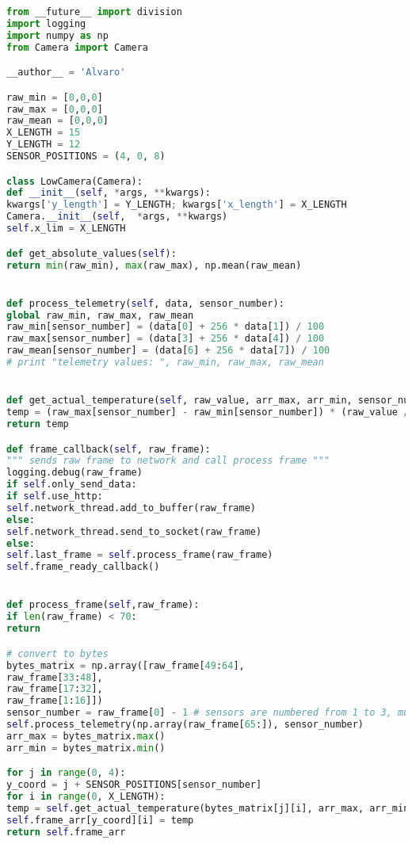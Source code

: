 \documentclass[hidelinks,11pt,a4paper,oneside,article]{memoir}
\begin{document}
\begin{lstlisting}[label={listing:lowcamera},caption={Processing of the Low camera},language=Python, style=styleprogramming]
from __future__ import division
import logging
import numpy as np
from Camera import Camera

__author__ = 'Alvaro'

raw_min = [0,0,0]
raw_max = [0,0,0]
raw_mean = [0,0,0]
X_LENGTH = 15
Y_LENGTH = 12
SENSOR_POSITIONS = (4, 0, 8)

class LowCamera(Camera):
def __init__(self, *args, **kwargs):
kwargs['y_length'] = Y_LENGTH; kwargs['x_length'] = X_LENGTH
Camera.__init__(self,  *args, **kwargs)
self.x_lim = X_LENGTH

def get_absolute_values(self):
return min(raw_min), max(raw_max), np.mean(raw_mean)


def process_telemetry(self, data, sensor_number):
global raw_min, raw_max, raw_mean
raw_min[sensor_number] = (data[0] + 256 * data[1]) / 100
raw_max[sensor_number] = (data[3] + 256 * data[4]) / 100
raw_mean[sensor_number] = (data[6] + 256 * data[7]) / 100
# print "telemetry values: ", raw_min, raw_max, raw_mean


def get_actual_temperature(self, raw_value, arr_max, arr_min, sensor_number):
temp = (raw_max[sensor_number] - raw_min[sensor_number]) * (raw_value / (arr_max - arr_min)) + raw_min[sensor_number]
return temp

def frame_callback(self, raw_frame):
""" sends raw frame to network and call process frame """
logging.debug(raw_frame)
if self.only_send_data:
if self.use_http:
self.network_thread.add_to_buffer(raw_frame)
else:
self.network_thread.send_to_socket(raw_frame)
else:
self.last_frame = self.process_frame(raw_frame)
self.frame_ready_callback()


def process_frame(self,raw_frame):
if len(raw_frame) < 70:
return

# convert to bytes
bytes_matrix = np.array([raw_frame[49:64],
raw_frame[33:48],
raw_frame[17:32],
raw_frame[1:16]])
sensor_number = raw_frame[0] - 1 # sensors are numbered from 1 to 3, must subtract 1
self.process_telemetry(np.array(raw_frame[65:]), sensor_number)
arr_max = bytes_matrix.max()
arr_min = bytes_matrix.min()

for j in range(0, 4):
y_coord = j + SENSOR_POSITIONS[sensor_number]
for i in range(0, X_LENGTH):
temp = self.get_actual_temperature(bytes_matrix[j][i], arr_max, arr_min, sensor_number)
self.frame_arr[y_coord][i] = temp
return self.frame_arr

\end{lstlisting}

\clearpage %
\end{document}
